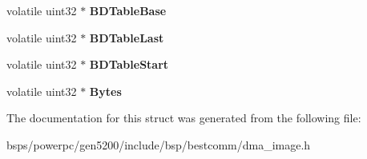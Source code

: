 \begin{DoxyCompactItemize}
volatile uint32 $\ast$ {\bfseries B\+D\+Table\+Base}
\item 
\mbox{\label{structtask__info2_a9e1f012ca7b1840c8d80e547a3aabec2}} 
volatile uint32 $\ast$ {\bfseries B\+D\+Table\+Last}
\item 
\mbox{\label{structtask__info2_a2987a09289f2bf4aaa5be1d21c4ddbc1}} 
volatile uint32 $\ast$ {\bfseries B\+D\+Table\+Start}
\item 
\mbox{\label{structtask__info2_ab7d3bc5127feb803070fd9be4ff6113a}} 
volatile uint32 $\ast$ {\bfseries Bytes}
\end{DoxyCompactItemize}


The documentation for this struct was generated from the following file\+:\begin{DoxyCompactItemize}
\item 
bsps/powerpc/gen5200/include/bsp/bestcomm/dma\+\_\+image.\+h\end{DoxyCompactItemize}
